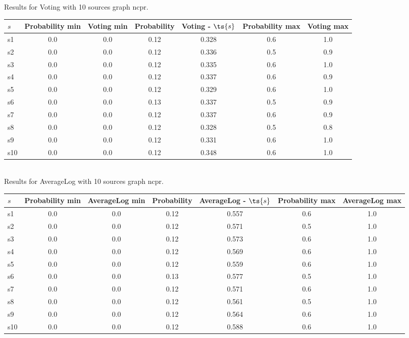 \documentclass{article}
\begin{document}
\noindent Results for Voting with 10 sources graph ncpr.

\noindent\begin{tabular}{|l|c|c|c|c|c|c|}
\hline
$s$& Probability min & Voting min & Probability & Voting - $\ts{s}$ & Probability max & Voting max\\
\hline
s1 &0.0 & 0.0 & 0.12 & 0.328 & 0.6 & 1.0\\
\hline
s2 &0.0 & 0.0 & 0.12 & 0.336 & 0.5 & 0.9\\
\hline
s3 &0.0 & 0.0 & 0.12 & 0.335 & 0.6 & 1.0\\
\hline
s4 &0.0 & 0.0 & 0.12 & 0.337 & 0.6 & 0.9\\
\hline
s5 &0.0 & 0.0 & 0.12 & 0.329 & 0.6 & 1.0\\
\hline
s6 &0.0 & 0.0 & 0.13 & 0.337 & 0.5 & 0.9\\
\hline
s7 &0.0 & 0.0 & 0.12 & 0.337 & 0.6 & 0.9\\
\hline
s8 &0.0 & 0.0 & 0.12 & 0.328 & 0.5 & 0.8\\
\hline
s9 &0.0 & 0.0 & 0.12 & 0.331 & 0.6 & 1.0\\
\hline
s10 &0.0 & 0.0 & 0.12 & 0.348 & 0.6 & 1.0\\
\hline
\end{tabular}\\

\noindent Results for AverageLog with 10 sources graph ncpr.

\noindent\begin{tabular}{|l|c|c|c|c|c|c|}
\hline
$s$& Probability min & AverageLog min & Probability & AverageLog - $\ts{s}$ & Probability max & AverageLog max\\
\hline
s1 &0.0 & 0.0 & 0.12 & 0.557 & 0.6 & 1.0\\
\hline
s2 &0.0 & 0.0 & 0.12 & 0.571 & 0.5 & 1.0\\
\hline
s3 &0.0 & 0.0 & 0.12 & 0.573 & 0.6 & 1.0\\
\hline
s4 &0.0 & 0.0 & 0.12 & 0.569 & 0.6 & 1.0\\
\hline
s5 &0.0 & 0.0 & 0.12 & 0.559 & 0.6 & 1.0\\
\hline
s6 &0.0 & 0.0 & 0.13 & 0.577 & 0.5 & 1.0\\
\hline
s7 &0.0 & 0.0 & 0.12 & 0.571 & 0.6 & 1.0\\
\hline
s8 &0.0 & 0.0 & 0.12 & 0.561 & 0.5 & 1.0\\
\hline
s9 &0.0 & 0.0 & 0.12 & 0.564 & 0.6 & 1.0\\
\hline
s10 &0.0 & 0.0 & 0.12 & 0.588 & 0.6 & 1.0\\
\hline
\end{tabular}\\
\end{document}
